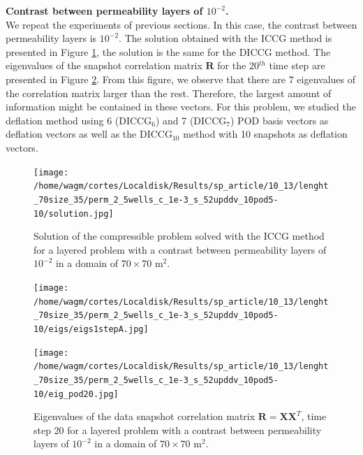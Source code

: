 \documentclass[12pt]{article}
\begin{document}
 
\textbf{Contrast between permeability layers of $10^{-2}$.}\\
We repeat the experiments of previous sections. In this case, the contrast between permeability layers is $10^{-2}$. 
The solution obtained with the ICCG method is presented in Figure \ref{fig:compsol_2}, the solution is the same 
for the DICCG method. The eigenvalues of the snapshot correlation matrix $\mathbf{R}$ for the 20$^{th}$ time 
step are presented in Figure \ref{fig:eig_POD_2}. 
From this figure, we observe that there are 7 eigenvalues of the correlation matrix larger than the rest. 
Therefore, the largest amount of information might be contained in these vectors. For this problem, we studied 
the deflation method using 6 (DICCG$_6$) and 7 (DICCG$_7$) POD basis vectors as deflation vectors as well as 
the DICCG$_{10}$ method with 10 snapshots as deflation vectors. 

\begin{figure}[!h]
\centering
\begin{minipage}{.7\textwidth}
 \centering
\texttt{[image: /home/wagm/cortes/Localdisk/Results/sp\_article/10\_13/lenght\_70size\_35/perm\_2\_5wells\_c\_1e-3\_s\_52upddv\_10pod5-10/solution.jpg]}
\caption{Solution of the compressible problem solved with the ICCG method for a layered problem with a contrast between permeability layers of $10^{-2}$ in a domain of $70 \times 70$ m$^2$.}
\label{fig:compsol_2}
\end{minipage}
\end{figure}

\begin{figure}[!h]
\centering
\begin{minipage}{.4\textwidth}
 \centering
 \vspace{-3mm}
\texttt{[image: /home/wagm/cortes/Localdisk/Results/sp\_article/10\_13/lenght\_70size\_35/perm\_2\_5wells\_c\_1e-3\_s\_52upddv\_10pod5-10/eigs/eigs1stepA.jpg]}
 \vspace{-10pt}
\caption{Eigenvalues of the original matrix $\mathbf{J}$, time step 1 for a layered problem with a contrast between permeability layers of $10^{-2}$ in a domain of $70 \times 70$ m$^2$.}\label{fig:eigs_A_2}
\end{minipage}%
\hspace{1cm}
\begin{minipage}{.4\textwidth}
 \centering
\texttt{[image: /home/wagm/cortes/Localdisk/Results/sp\_article/10\_13/lenght\_70size\_35/perm\_2\_5wells\_c\_1e-3\_s\_52upddv\_10pod5-10/eig\_pod20.jpg]}
\vspace{-5mm}
\caption{Eigenvalues of the data snapshot correlation matrix $\mathbf{R}=\mathbf{X}\mathbf{X}^T$, time step 20 for a layered problem with a contrast between permeability layers of $10^{-2}$ in a domain of $70 \times 70$ m$^2$.}
\label{fig:eig_POD_2}
\end{minipage}
\end{figure}
\end{document}
